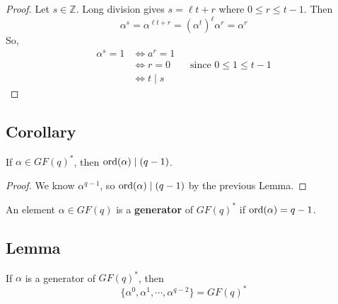\begin{proof}
    Let $ s\in\mathbb{Z} $. Long division gives $ s=\ell t+r $ where
    $ 0\leqslant r\leqslant t-1 $. Then
    \[ \alpha^s=\alpha^{\ell t+r}=(\alpha^t)^\ell \alpha^r=\alpha^r \]
    So,
    \begin{align*}
        \alpha^s=1&\iff a^r=1\\
        &\iff r=0 \qquad\text{since } 0\leqslant 1\leqslant t-1\\
        &\iff t\mid s
    \end{align*}
\end{proof}

\begin{thmbox}
\begin{theorem}
    \subsection{Corollary}
    If $ \alpha\in GF(q)^* $, then $ \operatorname{ord}(\alpha)\mid (q-1) $.
\end{theorem} \end{thmbox}

\begin{proof}
    We know $ \alpha^{q-1} $, so $ \operatorname{ord}(\alpha)\mid (q-1) $ by
    the previous Lemma.
\end{proof}

\begin{defbox}
    \begin{definition}
    An element $ \alpha\in GF(q) $ is a \textbf{generator} of
    $ GF(q)^* $ if $ \operatorname{ord}(\alpha)=q-1 $.
\end{definition} \end{defbox}

\begin{thmbox}
    \begin{theorem}
    \subsection{Lemma}
    If $ \alpha $ is a generator of $ GF(q)^* $, then
    \[ \{\alpha^0,\alpha^1,\cdots,\alpha^{q-2}\}=GF(q)^* \]
\end{theorem} \end{thmbox}
